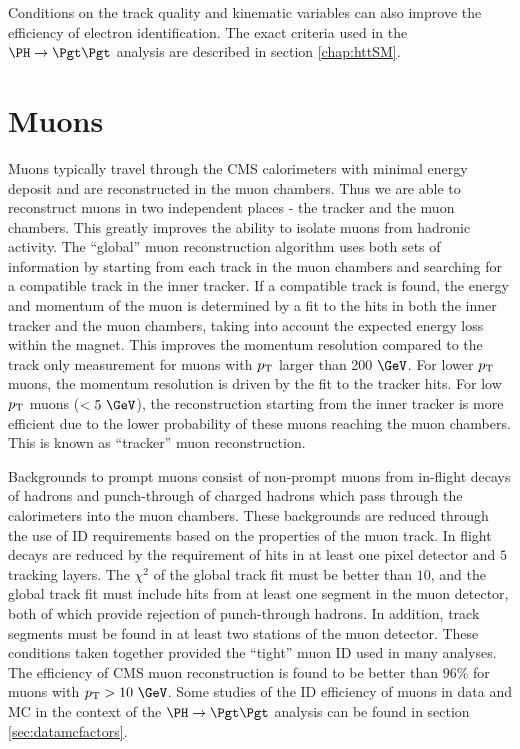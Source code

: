 Conditions on the track quality and kinematic variables can also improve the
efficiency of electron identification. The exact criteria used in the $\PH \to
\Pgt\Pgt$ analysis are described in section \ref{chap:httSM}.

\section{Muons}
\label{sec:muons}

Muons typically travel through the CMS calorimeters with minimal energy deposit
and are reconstructed in the muon chambers. Thus we are able to reconstruct
muons in two independent places - the tracker and the muon chambers. This
greatly improves the ability to isolate muons from hadronic activity. The
``global'' muon reconstruction algorithm \cite{MuonReco} uses both sets of information by
starting from each track in the muon chambers and searching for a compatible
track in the inner tracker. If a compatible track is found, the energy and
momentum of the muon is determined by a fit to the hits in both the inner
tracker and the muon chambers, taking into account the expected energy loss
within the magnet. This improves the momentum resolution compared to
the track only measurement for muons with $p_{\mathrm{T}}$ larger than 200 $\GeV$. For
lower $p_{\mathrm{T}}$ muons, the momentum resolution is driven by the fit to the tracker
hits. For low $p_{\mathrm{T}}$ muons ($< 5~\GeV$), the reconstruction starting from the inner
tracker is more efficient due to the lower probability of these muons reaching
the muon chambers. This is known as ``tracker'' muon reconstruction.  

Backgrounds to prompt muons consist of non-prompt muons from in-flight decays of
hadrons and punch-through of charged hadrons which pass through the calorimeters
into the muon chambers. These backgrounds are reduced through the use of ID
requirements based on the properties of the muon track. In flight decays are
reduced by the requirement of hits in at least one pixel detector and $5$
tracking layers. The $\chi^{2}$ of the global track fit must be better than
$10$, and the global track fit must include hits from at least one segment in
the muon detector, both of which provide rejection of punch-through hadrons. In
addition, track segments must be found in at least two stations of the muon
detector. These conditions taken together provided the ``tight'' muon ID used in
many analyses. The efficiency of CMS muon reconstruction is found to be better
than $96\%$ for muons with $\pt > 10~\GeV$. Some studies of the ID efficiency of
muons in data and \ac{MC} in the context of the $\PH \to \Pgt\Pgt$ analysis can
be found in section \ref{sec:datamcfactors}.

